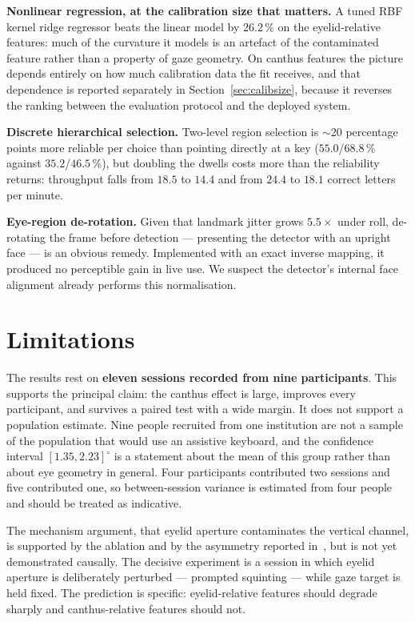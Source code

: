 \documentclass[conference]{IEEEtran}
\begin{document}
\textbf{Nonlinear regression, at the calibration size that matters.} A tuned
RBF kernel ridge regressor beats the linear model by $26.2\,\%$ on the
eyelid-relative features: much of the curvature it models is an artefact of the
contaminated feature rather than a property of gaze geometry. On canthus
features the picture depends entirely on how much calibration data the fit
receives, and that dependence is reported separately in
Section~\ref{sec:calibsize}, because it reverses the ranking between the
evaluation protocol and the deployed system.

\textbf{Discrete hierarchical selection.} Two-level region selection is
$\sim$20 percentage points more reliable per choice than pointing directly at a
key ($55.0$/$68.8\,\%$ against $35.2$/$46.5\,\%$), but doubling the dwells costs
more than the reliability returns: throughput falls from $18.5$ to $14.4$ and
from $24.4$ to $18.1$ correct letters per minute.

\textbf{Eye-region de-rotation.} Given that landmark jitter grows $5.5\times$
under roll, de-rotating the frame before detection --- presenting the detector
with an upright face --- is an obvious remedy. Implemented with an exact inverse
mapping, it produced no perceptible gain in live use. We suspect the detector's
internal face alignment already performs this normalisation.

\section{Limitations}
\label{sec:limits}

The results rest on \textbf{eleven sessions recorded from nine participants}.
This supports the principal claim: the canthus effect is large, improves every
participant, and survives a paired test with a wide margin. It does not support
a population estimate. Nine people recruited from one institution are not a
sample of the population that would use an assistive keyboard, and the
confidence interval $[1.35, 2.23]^\circ$ is a statement about the mean of this
group rather than about eye geometry in general. Four participants contributed
two sessions and five contributed one, so between-session variance is estimated
from four people and should be treated as indicative.

The mechanism argument, that eyelid aperture contaminates the vertical channel,
is supported by the ablation and by the asymmetry reported in~\cite{ref01}, but
is not yet demonstrated causally. The decisive experiment is a session in which
eyelid aperture is deliberately perturbed --- prompted squinting --- while gaze
target is held fixed. The prediction is specific: eyelid-relative features should
degrade sharply and canthus-relative features should not.
\end{document}
